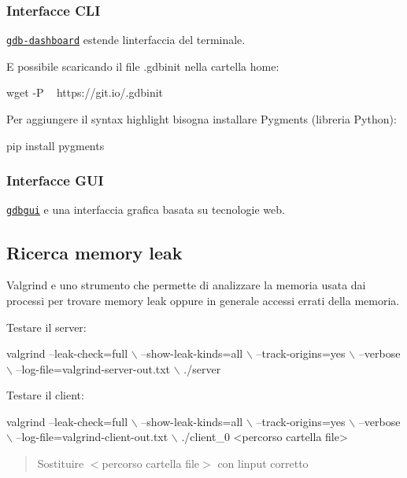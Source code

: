 \subsubsection*{Interfacce C\+LI}

\href{https://github.com/cyrus-and/gdb-dashboard}{\tt gdb-\/dashboard} estende l\textquotesingle{}interfaccia del terminale.



E\textquotesingle{} possibile scaricando il file {\ttfamily .gdbinit} nella cartella home\+: 
\begin{DoxyCode}
wget -P ~ https://git.io/.gdbinit
\end{DoxyCode}


Per aggiungere il syntax highlight bisogna installare Pygments (libreria Python)\+: 
\begin{DoxyCode}
pip install pygments
\end{DoxyCode}


\subsubsection*{Interfacce G\+UI}

\href{https://github.com/cs01/gdbgui}{\tt gdbgui} e\textquotesingle{} una interfaccia grafica basata su tecnologie web.



\subsection*{Ricerca memory leak}

Valgrind e\textquotesingle{} uno strumento che permette di analizzare la memoria usata dai processi per trovare memory leak oppure in generale accessi errati della memoria.

Testare il server\+: 
\begin{DoxyCode}
valgrind --leak-check=full \(\backslash\)
    --show-leak-kinds=all \(\backslash\)
    --track-origins=yes \(\backslash\)
    --verbose \(\backslash\)
    --log-file=valgrind-server-out.txt \(\backslash\)
    ./server
\end{DoxyCode}


Testare il client\+: 
\begin{DoxyCode}
valgrind --leak-check=full \(\backslash\)
    --show-leak-kinds=all \(\backslash\)
    --track-origins=yes \(\backslash\)
    --verbose \(\backslash\)
    --log-file=valgrind-client-out.txt \(\backslash\)
    ./client\_0 <percorso cartella file>
\end{DoxyCode}
 \begin{quote}
Sostituire {\ttfamily $<$percorso cartella file$>$} con l\textquotesingle{}input corretto \end{quote}


